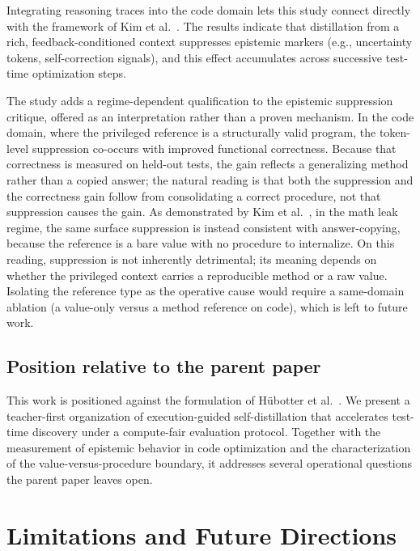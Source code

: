 \documentclass[12pt,a4paper]{report}
\begin{document}
Integrating reasoning traces into the code domain lets this study connect directly with the framework of Kim et al.~\cite{r2}. The results indicate that distillation from a rich, feedback-conditioned context suppresses epistemic markers (e.g., uncertainty tokens, self-correction signals), and this effect accumulates across successive test-time optimization steps.

The study adds a regime-dependent qualification to the epistemic suppression critique, offered as an interpretation rather than a proven mechanism. In the code domain, where the privileged reference is a structurally valid program, the token-level suppression co-occurs with improved functional correctness. Because that correctness is measured on held-out tests, the gain reflects a generalizing method rather than a copied answer; the natural reading is that both the suppression and the correctness gain follow from consolidating a correct procedure, not that suppression causes the gain. As demonstrated by Kim et al.~\cite{r2}, in the math leak regime, the same surface suppression is instead consistent with answer-copying, because the reference is a bare value with no procedure to internalize. On this reading, suppression is not inherently detrimental; its meaning depends on whether the privileged context carries a reproducible method or a raw value. Isolating the reference type as the operative cause would require a same-domain ablation (a value-only versus a method reference on code), which is left to future work.

\section{Position relative to the parent paper}\label{position-relative-to-the-parent-paper}

This work is positioned against the formulation of Hübotter et al.~\cite{r1}. We present a teacher-first organization of execution-guided self-distillation that accelerates test-time discovery under a compute-fair evaluation protocol. Together with the measurement of epistemic behavior in code optimization and the characterization of the value-versus-procedure boundary, it addresses several operational questions the parent paper leaves open.

\chapter{Limitations and Future Directions}\label{chapter-6-limitations-and-publication-roadmap}
\end{document}
